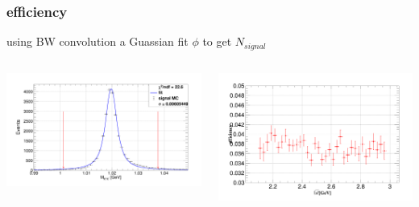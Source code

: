 \documentclass[aspectratio=169]{ctexbeamer}
\begin{document}
\begin{frame}
  \frametitle{efficiency}
  using BW convolution a Guassian fit $\phi$ to get $N_{signal}$
 \begin{columns}
  \begin{column}{0.5\textwidth}
   \centering
   \includegraphics[width=\textwidth]{figures/sMC_phi_fit_0.png}
  \end{column}

  \begin{column}{0.5\textwidth}
   \centering
   \includegraphics[width=\textwidth]{figures/1b36c40nphi_efficiency.png}
  \end{column}
 \end{columns} 
\end{frame}
\end{document}
